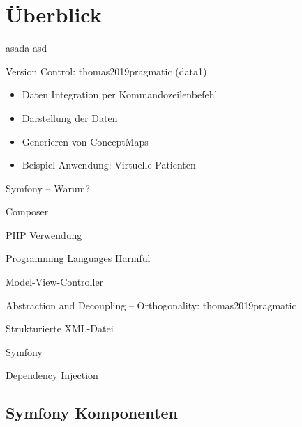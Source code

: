 \section{Überblick}

asada \bfarmer asd

Version Control: thomas2019pragmatic (data1)

\begin{itemize}
\item Daten Integration per Kommandozeilenbefehl
\item Darstellung der Daten
\item Generieren von ConceptMaps
\item Beispiel-Anwendung: Virtuelle Patienten 
\end{itemize}

Symfony -- Warum?  \cite{potencier2022symfony}

Composer \cite{composer}

PHP Verwendung \cite{w3techs}

Programming Languages Harmful \cite{janssenscan}

Model-View-Controller \cite[Seite 176f]{voorhees2020guide}

\begin{figure}[H]
    \centering
    \setlength{\fboxsep}{10pt}\color{black!20}
    \normalcolor\caption{\cite[Seite 177]{voorhees2020guide}}
\end{figure}

Abstraction and Decoupling -- Orthogonality: thomas2019pragmatic

Strukturierte XML-Datei \label{datei-strukt}

Symfony \cite{potencier2022symfony}

Dependency Injection \cite{seemann2019dependency}

\subsection{Symfony Komponenten}

